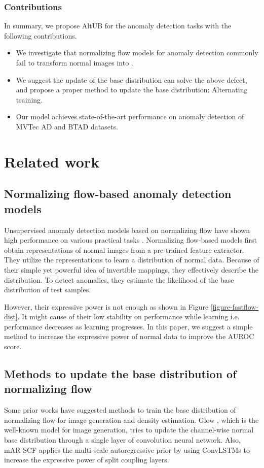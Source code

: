 \documentclass[letterpaper]{article}
\begin{document}
\subsubsection{Contributions} In summary, we propose AltUB for the anomaly detection tasks with the following contributions.
\begin{itemize}
    \item We investigate that normalizing flow models for anomaly detection commonly fail to transform normal images into .
    \item We suggest the update of the base distribution can solve the above defect, and propose a proper method to update the base distribution: Alternating training.
    \item Our model achieves state-of-the-art performance on anomaly detection of MVTec AD and BTAD datasets.
\end{itemize}

\section{Related work}
\subsection{Normalizing flow-based anomaly detection models}
Unsupervised anomaly detection models based on normalizing flow have shown high performance on various practical tasks \cite{rudolph1, yu1, gudovskiy1}. Normalizing flow-based models first obtain representations of normal images from a pre-trained feature extractor. They utilize the representations to learn a distribution of normal data. Because of their simple yet powerful idea of invertible mappings, they effectively describe the distribution. To detect anomalies, they estimate the likelihood of the base distribution of test samples.

However, their expressive power is not enough as shown in Figure \ref{figure-fastflow-dist}. It might cause of their low stability on performance while learning i.e. performance decreases as learning progresses. In this paper, we suggest a simple method to increase the expressive power of normal data to improve the AUROC score.

\subsection{Methods to update the base distribution of normalizing flow}
Some prior works \cite{kingma1, mar-scf} have suggested methods to train the base distribution of normalizing flow for image generation and density estimation. Glow \cite{kingma1}, which is the well-known model for image generation, tries to update the channel-wise normal base distribution through a single layer of convolution neural network. Also, mAR-SCF \cite{mar-scf} applies the multi-scale autoregressive prior by using ConvLSTMs to increase the expressive power of split coupling layers.
\end{document}
